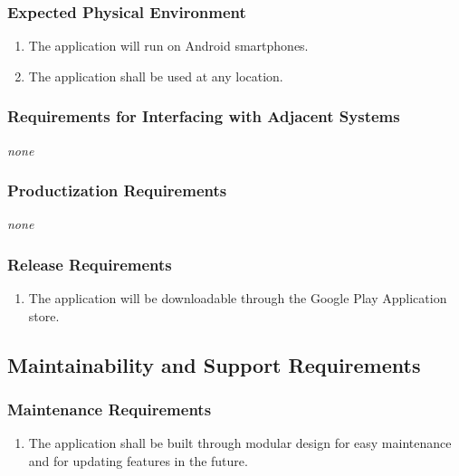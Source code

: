 \documentclass[12pt, titlepage]{article}
\begin{document}
\subsubsection{Expected Physical Environment}
\label{ssub:expected_physical_environment}
\begin{enumerate}[{OE}1. ]
	\item The application will run on Android smartphones.
	\item The application shall be used at any location.
\end{enumerate}

\subsubsection{Requirements for Interfacing with Adjacent Systems}
\label{ssub:requirements_for_interfacing_with_adjacent_systems}
\emph{none}

\subsubsection{Productization Requirements}
\label{ssub:productization_requirements}
\emph{none}

\subsubsection{Release Requirements}
\label{ssub:release_requirements}
\begin{enumerate}[{OE}3. ]
	\item The application will be downloadable through the Google Play Application store.
\end{enumerate}


\subsection{Maintainability and Support Requirements}
\label{sub:maintainability_and_support_requirements}

\subsubsection{Maintenance Requirements}
\label{ssub:maintenance_requirements}
\begin{enumerate}[{MS}1. ]
	\item The application shall be built through modular design for easy maintenance and for updating features in the future.
\end{enumerate}
\end{document}
